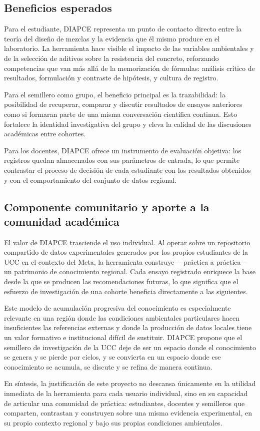 \subsection*{Beneficios esperados}

Para el estudiante, DIAPCE representa un punto de contacto directo entre la teoría del diseño de mezclas y la evidencia que él mismo produce en el laboratorio. La herramienta hace visible el impacto de las variables ambientales y de la selección de aditivos sobre la resistencia del concreto, reforzando competencias que van más allá de la memorización de fórmulas: análisis crítico de resultados, formulación y contraste de hipótesis, y cultura de registro.

Para el semillero como grupo, el beneficio principal es la trazabilidad: la posibilidad de recuperar, comparar y discutir resultados de ensayos anteriores como si formaran parte de una misma conversación científica continua. Esto fortalece la identidad investigativa del grupo y eleva la calidad de las discusiones académicas entre cohortes.

Para los docentes, DIAPCE ofrece un instrumento de evaluación objetiva: los registros quedan almacenados con sus parámetros de entrada, lo que permite contrastar el proceso de decisión de cada estudiante con los resultados obtenidos y con el comportamiento del conjunto de datos regional.

\subsection*{Componente comunitario y aporte a la comunidad académica}

El valor de DIAPCE trasciende el uso individual. Al operar sobre un repositorio compartido de datos experimentales generados por los propios estudiantes de la UCC en el contexto del Meta, la herramienta construye —práctica a práctica— un patrimonio de conocimiento regional. Cada ensayo registrado enriquece la base desde la que se producen las recomendaciones futuras, lo que significa que el esfuerzo de investigación de una cohorte beneficia directamente a las siguientes.

Este modelo de acumulación progresiva del conocimiento es especialmente relevante en una región donde las condiciones ambientales particulares hacen insuficientes las referencias externas y donde la producción de datos locales tiene un valor formativo e institucional difícil de sustituir. DIAPCE propone que el semillero de investigación de la UCC deje de ser un espacio donde el conocimiento se genera y se pierde por ciclos, y se convierta en un espacio donde ese conocimiento se acumula, se discute y se refina de manera continua.

En síntesis, la justificación de este proyecto no descansa únicamente en la utilidad inmediata de la herramienta para cada usuario individual, sino en su capacidad de articular una comunidad de práctica: estudiantes, docentes y semilleros que comparten, contrastan y construyen sobre una misma evidencia experimental, en su propio contexto regional y bajo sus propias condiciones ambientales.
